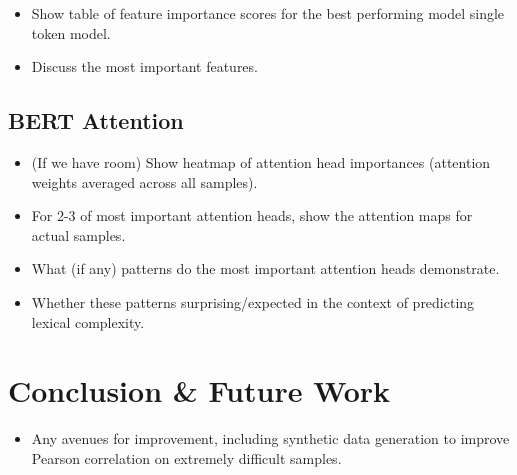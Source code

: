 \documentclass[11pt,a4paper]{article}
\begin{document}
\begin{itemize}
  \item Show table of feature importance scores for the best performing model single token model.
  \item Discuss the most important features.
\end{itemize}

\subsection{BERT Attention}

\begin{itemize}
  \item (If we have room) Show heatmap of attention head importances (attention weights averaged across all samples).
  \item For 2-3 of most important attention heads, show the attention maps for actual samples.
  \item What (if any) patterns do the most important attention heads demonstrate.
  \item Whether these patterns surprising/expected in the context of predicting lexical complexity.
\end{itemize}

\section{Conclusion \& Future Work}
\begin{itemize}
  \item Any avenues for improvement, including synthetic data generation to improve Pearson correlation on extremely difficult samples.
\end{itemize}




\end{document}
